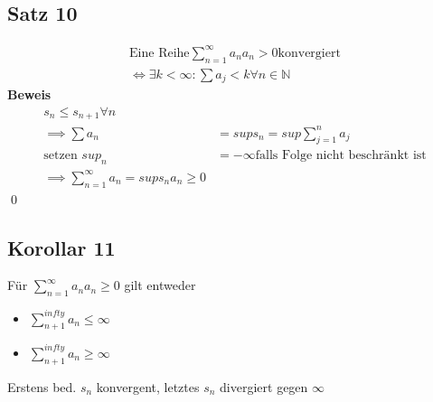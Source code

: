 \documentclass[fleqn]{scrbook}
\newcommand{\N}{\mathbb{N}}
\renewenvironment{proof}{{\bfseries Beweis }}{\qed}
\begin{document}
\subsection{Satz 10}
  \begin{equation}
    \begin{split}
      \text{Eine Reihe} \sum_{n=1}^{\infty} a_n a_n>0 \text{konvergiert} \\
      \Leftrightarrow \exists k < \infty : \sum a_j < k \forall n \in \N
    \end{split}
  \end{equation}
  \begin{proof}
    \begin{equation}
      \begin{split}
	s_n \le s_{n+1} \forall n \\
	\implies \sum a_n &= sup s_n = sup \sum_{j=1}^{n} a_j \\
	\text{setzen }sup_n &= -\infty \text{falls Folge nicht beschränkt ist} \\
	\implies \sum_{n=1}^{\infty} a_n = sup s_n a_n \ge 0
      \end{split}
    \end{equation}
  \end{proof}

\subsection{Korollar 11}
  Für $\sum_{n=1}^{\infty}a_n a_n \ge 0$ gilt entweder
  \begin{itemize}
    \item $\sum_{n+1}^{infty} a_n \le \infty$
    \item $\sum_{n+1}^{infty} a_n \ge \infty$
  \end{itemize}
  Erstens bed. $s_n$ konvergent, letztes $s_n$ divergiert gegen $\infty$
  
\end{document}
